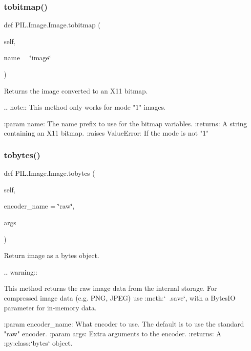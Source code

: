\subsubsection{\texorpdfstring{tobitmap()}{tobitmap()}}
{\footnotesize\ttfamily def P\+I\+L.\+Image.\+Image.\+tobitmap (\begin{DoxyParamCaption}\item[{}]{self,  }\item[{}]{name = {\ttfamily \char`\"{}image\char`\"{}} }\end{DoxyParamCaption})}

\begin{DoxyVerb}Returns the image converted to an X11 bitmap.

.. note:: This method only works for mode "1" images.

:param name: The name prefix to use for the bitmap variables.
:returns: A string containing an X11 bitmap.
:raises ValueError: If the mode is not "1"
\end{DoxyVerb}
 \mbox{\label{classPIL_1_1Image_1_1Image_ab7cdf135e49111cd62fae555e637b92f}} 
\subsubsection{\texorpdfstring{tobytes()}{tobytes()}}
{\footnotesize\ttfamily def P\+I\+L.\+Image.\+Image.\+tobytes (\begin{DoxyParamCaption}\item[{}]{self,  }\item[{}]{encoder\+\_\+name = {\ttfamily \char`\"{}raw\char`\"{}},  }\item[{}]{args }\end{DoxyParamCaption})}

\begin{DoxyVerb}Return image as a bytes object.

.. warning::

    This method returns the raw image data from the internal
    storage.  For compressed image data (e.g. PNG, JPEG) use
    :meth:`~.save`, with a BytesIO parameter for in-memory
    data.

:param encoder_name: What encoder to use.  The default is to
             use the standard "raw" encoder.
:param args: Extra arguments to the encoder.
:returns: A :py:class:`bytes` object.
\end{DoxyVerb}
 \mbox{\label{classPIL_1_1Image_1_1Image_a697bef5a15ec1db43991020bfe6690d1}} 
